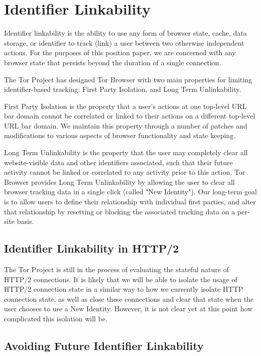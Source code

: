 \documentclass[letterpaper,11pt]{llncs}
\begin{document}
\section{Identifier Linkability}

Identifier linkability is the ability to use any form of browser state, cache,
data storage, or identifier to track (link) a user between two otherwise
independent actions. For the purposes of this position paper, we are concerned
with any browser state that persists beyond the duration of a single
connection.

The Tor Project has designed Tor Browser with two main properties for limiting
identifier-based tracking: First Party Isolation, and Long Term Unlinkability.

First Party Isolation is the property that a user's actions at one
top-level URL bar domain cannot be correlated or linked to their actions on a
different top-level URL bar domain. We maintain this property through a number
of patches and modifications to various aspects of browser functionality and
state keeping.

Long Term Unlinkability is the property that the user may completely clear all
website-visible data and other identifiers associated, such that their future
activity cannot be linked or correlated to any activity prior to this action.
Tor Browser provides Long Term Unlinkability by allowing the user to clear all
browser tracking data in a single click (called "New Identity"). Our long-term
goal is to allow users to define their relationship with individual first
parties, and alter that relationship by resetting or blocking the associated
tracking data on a per-site basis.

\subsection{Identifier Linkability in HTTP/2}

The Tor Project is still in the process of evaluating the stateful nature of
HTTP/2 connections. It is likely that we will be able to isolate the usage of
HTTP/2 connection state in a similar way to how we currently isolate HTTP
connection state, as well as close these connections and clear that state when
the user chooses to use a New Identity. However, it is not clear yet at this
point how complicated this isolation will be.

\subsection{Avoiding Future Identifier Linkability}
\end{document}
